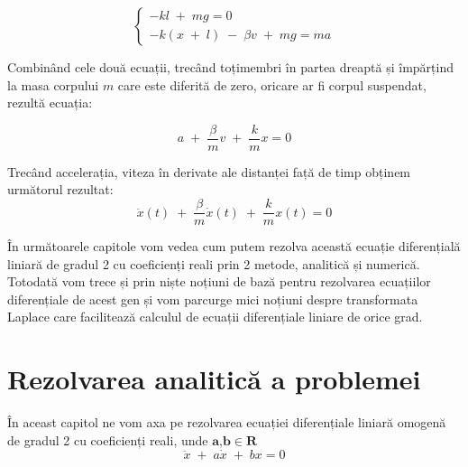 \documentclass[12pt, a4paper]{article}
\begin{document}
\begin{equation}
\left\{
    \begin{array}{lr}
        -kl\;+\;mg = 0\\
        -k(x\;+\;l)\;-\;\beta v\;+\;mg = ma
    \end{array}
\right.
\end{equation}

Combinând cele două ecuații, trecând toțimembri în partea dreaptă și împărțind la masa corpului $m$ care este diferită de zero, oricare ar fi corpul suspendat, rezultă ecuația:

\begin{equation}
    a\;+\;\frac{\beta}{m}v\;+\;\frac{k}{m}x = 0
\end{equation}

Trecând accelerația, viteza în derivate ale distanței față de timp obținem următorul rezultat:
\begin{equation}
    \ddot{x}(t)\;+\;\frac{\beta}{m}\dot{x}(t)\;+\;\frac{k}{m}x(t) = 0
\end{equation}

În următoarele capitole vom vedea cum putem rezolva această ecuație diferențială liniară de gradul 2 cu coeficienți reali prin 2 metode, analitică și numerică.\cite{joel99} Totodată vom trece și prin niște noțiuni de bază pentru rezolvarea ecuațiilor diferențiale de acest gen și vom parcurge mici noțiuni despre transformata Laplace care facilitează calculul de ecuații diferențiale liniare de orice grad.

\newpage

\section{Rezolvarea analitică a problemei}
\hspace{0.4cm}În aceast capitol ne vom axa pe rezolvarea ecuației diferențiale liniară omogenă de gradul 2 cu coeficienți reali, unde $\textbf{a,b}\in\mathbf{R}$
$$\ddot{x}\;+\;a\dot{x}\;+\;bx = 0$$
\end{document}
